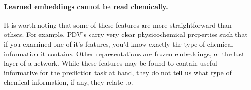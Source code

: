 \paragraph{Learned embeddings cannot be read chemically.}

It is worth noting that some of these features are more straightforward than others. For example, PDV's carry very clear physicochemical properties such that if you examined one of it's features, you'd know exactly the type of chemical information it contains. Other representations are frozen embeddings, or the last layer of a network. While these features may be found to contain useful informative for the prediction task at hand, they do not tell us what type of chemical information, if any, they relate to.


